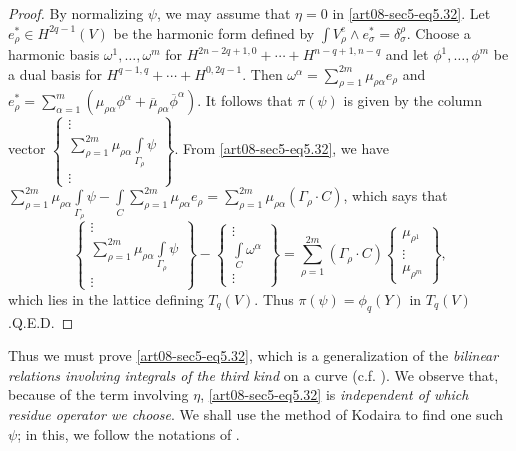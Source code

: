 \begin{proof}
By normalizing $\psi$, we may assume that $\eta=0$ in \eqref{art08-sec5-eq5.32}. Let $e^{*}_{\rho}\in H^{2q-1}(V)$ be the harmonic form defined by $\int V^{e}_{\rho}\wedge e^{*}_{\sigma}=\delta^{\rho}_{\sigma}$. Choose a harmonic basis $\omega^{1},\ldots,\omega^{m}$ for $H^{2n-2q+1,0}+\cdots+H^{n-q+1,n-q}$ and let $\phi^{1},\ldots,\phi^{m}$ be a dual basis for $H^{q-1,q}+\cdots+H^{0,2q-1}$. Then $\omega^{\alpha}=\sum\limits^{2m}_{\rho=1}\mu_{\rho\alpha}e_{\rho}$ and $e^{*}_{\rho}=\sum\limits^{m}_{\alpha=1}(\mu_{\rho\alpha}\phi^{\alpha}+\overline{\mu}_{\rho\alpha}\overline{\phi}^{\alpha})$. It follows that $\pi(\psi)$ is given by the column vector $\left\{\begin{smallmatrix} \vdots \\ \sum\limits^{2m}_{\rho=1}\mu_{\rho\alpha}\int\limits_{\Gamma_{\rho}}\psi\\ \vdots\end{smallmatrix}\right\}$. From \eqref{art08-sec5-eq5.32}, we have $\sum\limits^{2m}_{\rho=1}\mu_{\rho\alpha}\int\limits_{\Gamma_{\rho}}\psi-\int\limits_{C}\sum\limits^{2m}_{\rho=1}\mu_{\rho\alpha}e_{\rho}=\sum\limits^{2m}_{\rho=1}\mu_{\rho\alpha}(\Gamma_{\rho}\cdot C)$, which says that
$$
\left\{\begin{matrix}
\vdots\\
\sum\limits^{2m}_{\rho=1}\mu_{\rho\alpha}\int\limits_{\Gamma_{\rho}}\psi\\
\vdots
\end{matrix}\right\}
-
\left\{\begin{matrix}
\vdots\\
\int\limits_{C}\omega^{\alpha}\\
\vdots
\end{matrix}\right\}
=\sum\limits^{2m}_{\rho=1}(\Gamma_{\rho}\cdot C)
\left\{\begin{matrix}
\mu_{\rho^{1}}\\
\vdots\\
\mu_{\rho^{m}}
\end{matrix}\right\},
$$
which lies in the lattice defining $T_{q}(V)$. Thus $\pi(\psi)=\phi_{q}(Y)$ in $T_{q}(V)$.\hfill Q.E.D.
\end{proof}

Thus we must prove \eqref{art08-sec5-eq5.32}, which is a generalization of the {\em bilinear relations involving integrals of the third kind} on a curve (c.f. \cite{art08-key24}). We observe that, because of the term involving $\eta$, \eqref{art08-sec5-eq5.32} is {\em independent of which residue operator we choose}. We shall use the method of Kodaira \cite{art08-key17} to find one such $\psi$; in this, we follow the notations of \cite{art08-key17}.

